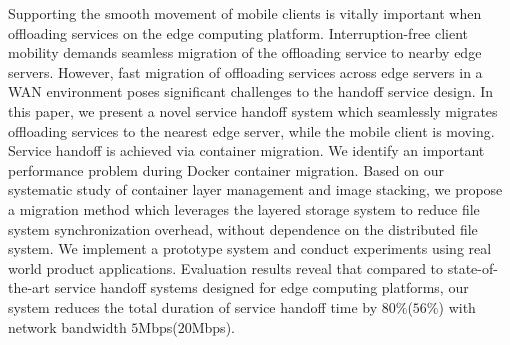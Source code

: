 
Supporting the smooth movement of mobile clients is vitally important when offloading services on the edge computing platform. Interruption-free client mobility demands seamless migration of the offloading service to nearby edge servers.
However, fast migration of offloading services across edge servers in a WAN environment poses significant challenges to the handoff service design. 
In this paper, we present a novel service handoff system which seamlessly migrates offloading services to the nearest edge server, while the mobile client is moving. 
Service handoff is achieved via container migration. 
We identify an important performance problem during Docker container migration.
Based on our systematic study of container layer management and image stacking,
we propose a migration method which leverages the layered storage system to reduce file system synchronization overhead, without dependence on the distributed file system. 
We implement a prototype system and conduct experiments using real world product applications.
Evaluation results reveal that compared to state-of-the-art service handoff systems designed for edge computing platforms, our system reduces the total duration of service handoff time by 
$80\%$($56\%$) with network bandwidth $5$Mbps($20$Mbps).







%
%
%


